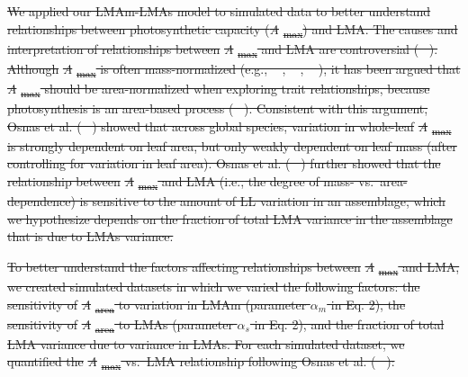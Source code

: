 \documentclass[
  12pt,
  letterpaper,
  DIV=11,
  numbers=noendperiod]{scrartcl}
\providecommand{\DIFdel}[1]{{\protect\color{red}\sout{#1}}}                      %
\begin{document}
\DIFdel{We applied our LMAm-LMAs model to simulated data to better understand
relationships between photosynthetic capacity
(}\emph{\DIFdel{A}}%
\DIFdel{\textsubscript{max}) and LMA. The causes and interpretation of
relationships between }\emph{\DIFdel{A}}%
\DIFdel{\textsubscript{max} and LMA are
controversial (\mbox{%
\citeproc{ref-Westoby2013}{Westoby et al. 2013}}\hspace{0pt}%
).
Although }\emph{\DIFdel{A}}%
\DIFdel{\textsubscript{max} is often mass-normalized (e.g.,
\mbox{%
\citeproc{ref-Wright2004a}{Wright et al. 2004}}\hspace{0pt}%
,
\mbox{%
\citeproc{ref-Shipley2006}{Shipley et al. 2006}}\hspace{0pt}%
,
\mbox{%
\citeproc{ref-Blonder2011}{Blonder et al. 2011}}\hspace{0pt}%
), it has been argued
that }\emph{\DIFdel{A}}%
\DIFdel{\textsubscript{max} should be area-normalized when
exploring trait relationships, because photosynthesis is an area-based
process (\mbox{%
\citeproc{ref-Lloyd2013}{Lloyd et al. 2013}}\hspace{0pt}%
). Consistent with this argument, Osnas et al. (\mbox{%
\citeproc{ref-Osnas2013}{2013}}\hspace{0pt}%
) showed that
across global species, variation in whole-leaf
}\emph{\DIFdel{A}}%
\DIFdel{\textsubscript{max} is strongly dependent on leaf area, but only
weakly dependent on leaf mass (after controlling for variation in leaf
area). Osnas et al. (\mbox{%
\citeproc{ref-Osnas2018}{2018}}\hspace{0pt}%
) further showed that
the relationship between }\emph{\DIFdel{A}}%
\DIFdel{\textsubscript{max} and LMA (i.e., the
degree of mass- vs.~area-dependence) is sensitive to the amount of LL
variation in an assemblage, which we hypothesize depends on the fraction
of total LMA variance in the assemblage that is due to LMAs variance.
}%

\DIFdel{To better understand the factors affecting relationships between
}\emph{\DIFdel{A}}%
\DIFdel{\textsubscript{max} and LMA, we created simulated datasets in
which we varied the following factors: the sensitivity of
}\emph{\DIFdel{A}}%
\DIFdel{\textsubscript{area} to variation in LMAm (parameter
\(\alpha_m\) in Eq. 2), the sensitivity of }\emph{\DIFdel{A}}%
\DIFdel{\textsubscript{area}
to LMAs (parameter \(\alpha_s\) in Eq. 2), and the fraction of total LMA
variance due to variance in LMAs. For each simulated dataset, we
quantified the }\emph{\DIFdel{A}}%
\DIFdel{\textsubscript{max} vs.~LMA relationship
following Osnas et al. (\mbox{%
\citeproc{ref-Osnas2018}{2018}}\hspace{0pt}%
):
}%
\end{document}
